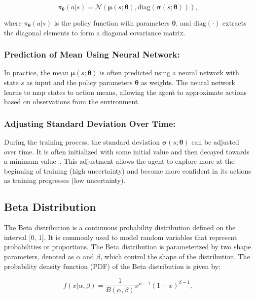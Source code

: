 \begin{equation}
    \pi_{\boldsymbol{\theta}}(a | s) = \mathcal{N}(\boldsymbol{\mu}(s; \boldsymbol{\theta}), \text{diag}(\boldsymbol{\sigma}(s; \boldsymbol{\theta}))),\label{eq:equation2}
\end{equation}

where $\pi_{\boldsymbol{\theta}}(a | s)$ is the policy function with parameters $\boldsymbol{\theta}$, and $\text{diag}(\cdot)$ extracts the diagonal elements to form a diagonal covariance matrix.

\subsubsection*{Prediction of Mean Using Neural Network:}
In practice, the mean $\boldsymbol{\mu}(s; \boldsymbol{\theta})$ is often predicted using a neural network with state $s$ as input and the policy parameters $\boldsymbol{\theta}$ as weights.
The neural network learns to map states to action means, allowing the agent to approximate actions based on observations from the environment.

\subsubsection*{Adjusting Standard Deviation Over Time:}
During the training process, the standard deviation $\boldsymbol{\sigma}(s; \boldsymbol{\theta})$ can be adjusted over time.
It is often initialized with some initial value and then decayed towards a minimum value~\cite{capasso2021endtoend, sutton2018reinforcement, mnih2015humanlevel}.
This adjustment allows the agent to explore more at the beginning of training (high uncertainty) and become more confident in its actions as training progresses (low uncertainty).

\subsection{Beta Distribution}\label{subsec:beta-distribution}
The Beta distribution is a continuous probability distribution defined on the interval [0, 1].
It is commonly used to model random variables that represent probabilities or proportions.
The Beta distribution is parameterized by two shape parameters, denoted as $\alpha$ and $\beta$, which control the shape of the distribution. The probability density function (PDF) of the Beta distribution is given by:

\begin{equation}
    f(x | \alpha, \beta) = \frac{1}{B(\alpha, \beta)} x^{\alpha - 1}(1 - x)^{\beta - 1},\label{eq:equation4}
\end{equation}

